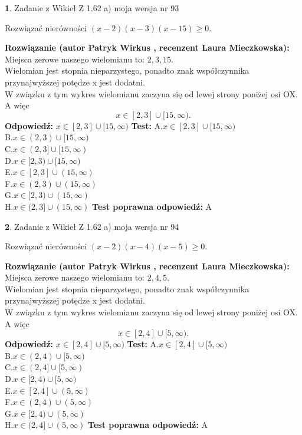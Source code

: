 \documentclass[12pt, a4paper]{article}
\theoremstyle{definition} %
\newtheorem{zad}{}
\newcommand{\zadStart}[1]{\begin{zad}#1\newline}
\newcommand{\zadStop}{\end{zad}}
\newcommand{\rozwStart}[2]{\noindent \textbf{Rozwiązanie (autor #1 , recenzent #2): }\newline}
\newcommand{\rozwStop}{\newline}
\newcommand{\odpStart}{\noindent \textbf{Odpowiedź:}\newline}
\newcommand{\odpStop}{\newline}
\newcommand{\testStart}{\noindent \textbf{Test:}\newline}
\newcommand{\testStop}{\newline}
\newcommand{\kluczStart}{\noindent \textbf{Test poprawna odpowiedź:}\newline}
\newcommand{\kluczStop}{\newline}
\begin{document}
\zadStart{Zadanie z Wikieł Z 1.62 a) moja wersja nr 93}

Rozwiązać nierówności $(x-2)(x-3)(x-15)\ge0$.
\zadStop
\rozwStart{Patryk Wirkus}{Laura Mieczkowska}
Miejsca zerowe naszego wielomianu to: $2, 3, 15$.\\
Wielomian jest stopnia nieparzystego, ponadto znak współczynnika przy\linebreak najwyższej potędze x jest dodatni.\\ W związku z tym wykres wielomianu zaczyna się od lewej strony poniżej osi OX. A więc $$x \in [2,3] \cup [15,\infty).$$
\rozwStop
\odpStart
$x \in [2,3] \cup [15,\infty)$
\odpStop
\testStart
A.$x \in [2,3] \cup [15,\infty)$\\
B.$x \in (2,3) \cup [15,\infty)$\\
C.$x \in (2,3] \cup [15,\infty)$\\
D.$x \in [2,3) \cup [15,\infty)$\\
E.$x \in [2,3] \cup (15,\infty)$\\
F.$x \in (2,3) \cup (15,\infty)$\\
G.$x \in [2,3) \cup (15,\infty)$\\
H.$x \in (2,3] \cup (15,\infty)$
\testStop
\kluczStart
A
\kluczStop



\zadStart{Zadanie z Wikieł Z 1.62 a) moja wersja nr 94}

Rozwiązać nierówności $(x-2)(x-4)(x-5)\ge0$.
\zadStop
\rozwStart{Patryk Wirkus}{Laura Mieczkowska}
Miejsca zerowe naszego wielomianu to: $2, 4, 5$.\\
Wielomian jest stopnia nieparzystego, ponadto znak współczynnika przy\linebreak najwyższej potędze x jest dodatni.\\ W związku z tym wykres wielomianu zaczyna się od lewej strony poniżej osi OX. A więc $$x \in [2,4] \cup [5,\infty).$$
\rozwStop
\odpStart
$x \in [2,4] \cup [5,\infty)$
\odpStop
\testStart
A.$x \in [2,4] \cup [5,\infty)$\\
B.$x \in (2,4) \cup [5,\infty)$\\
C.$x \in (2,4] \cup [5,\infty)$\\
D.$x \in [2,4) \cup [5,\infty)$\\
E.$x \in [2,4] \cup (5,\infty)$\\
F.$x \in (2,4) \cup (5,\infty)$\\
G.$x \in [2,4) \cup (5,\infty)$\\
H.$x \in (2,4] \cup (5,\infty)$
\testStop
\kluczStart
A
\kluczStop
\end{document}
